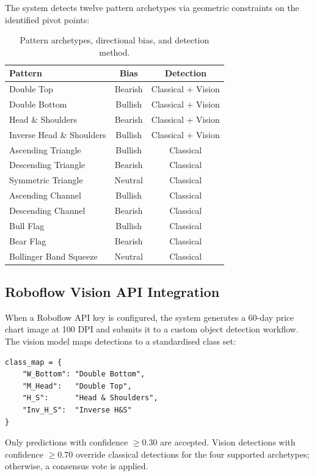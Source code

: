\documentclass[10pt,a4paper,twoside]{article}
\begin{document}
The system detects twelve pattern archetypes via geometric constraints on the
identified pivot points:

\begin{table}[htb]
  \begin{center}
    {\caption{Pattern archetypes, directional bias, and detection method.}
    \label{tab:patterns}}
    \begin{tabular}{|l|c|c|}
    \hline
    \textbf{Pattern} & \textbf{Bias} & \textbf{Detection} \\
    \hline
    Double Top & Bearish & Classical + Vision \\
    Double Bottom & Bullish & Classical + Vision \\
    Head \& Shoulders & Bearish & Classical + Vision \\
    Inverse Head \& Shoulders & Bullish & Classical + Vision \\
    Ascending Triangle & Bullish & Classical \\
    Descending Triangle & Bearish & Classical \\
    Symmetric Triangle & Neutral & Classical \\
    Ascending Channel & Bullish & Classical \\
    Descending Channel & Bearish & Classical \\
    Bull Flag & Bullish & Classical \\
    Bear Flag & Bearish & Classical \\
    Bollinger Band Squeeze & Neutral & Classical \\
    \hline
    \end{tabular}
  \end{center}
\end{table}

\subsection{Roboflow Vision API Integration}

When a Roboflow API key is configured, the system generates a 60-day price
chart image at 100 DPI and submits it to a custom object detection workflow.
The vision model maps detections to a standardised class set:
\begin{verbatim}
class_map = {
    "W_Bottom": "Double Bottom",
    "M_Head":   "Double Top",
    "H_S":      "Head & Shoulders",
    "Inv_H_S":  "Inverse H&S"
}
\end{verbatim}
Only predictions with confidence $\geq 0.30$ are accepted. Vision detections
with confidence $\geq 0.70$ override classical detections for the four supported
archetypes; otherwise, a consensus vote is applied.
\end{document}

